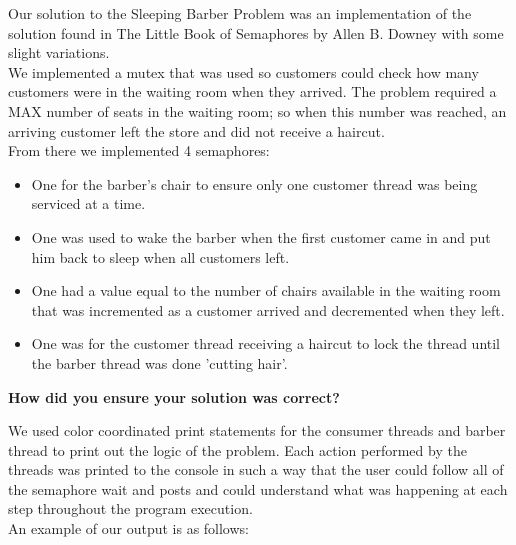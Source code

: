 \documentclass[10pt,letterpaper,draftclsnofoot,onecolumn]{IEEEtran}
\begin{document}
\noindent Our solution to the Sleeping Barber Problem was an implementation of the solution found in The Little Book of Semaphores by Allen B. Downey with some slight variations.\\
We implemented a mutex that was used so customers could check how many customers were in the waiting room when they arrived. The problem required a MAX number of seats in the waiting room; so when this number was reached, an arriving customer left the store and did not receive a haircut.\\
From there we implemented 4 semaphores:
\begin{itemize}
\item One for the barber's chair to ensure only one customer thread was being serviced at a time.
\item One was used to wake the barber when the first customer came in and put him back to sleep when all customers left.
\item One had a value equal to the number of chairs available in the waiting room that was incremented as a customer arrived and decremented when they left.
\item One was for the customer thread receiving a haircut to lock the thread until the barber thread was done 'cutting hair'.
\end{itemize}

\pagebreak

\noindent\textbf{How did you ensure your solution was correct?}
\medskip

\noindent We used color coordinated print statements for the consumer threads and barber thread to print out the logic of the problem. Each action performed by the threads was printed to the console in such a way that the user could follow all of the semaphore wait and posts and could understand what was happening at each step throughout the program execution.\\
\medskip An example of our output is as follows:
\end{document}
